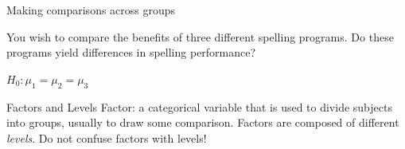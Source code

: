 \documentclass[presentation]{beamer}
\begin{document}
\begin{frame}[label={sec:org378e3be}]{Making comparisons across groups}
\begin{example}[Spelling]
You wish to compare the benefits of three different spelling programs.  Do
these programs yield differences in spelling performance?
\end{example}

\(H_0: \mu_1 = \mu_2 = \mu_3\)

\begin{alertblock}{Factors and Levels}
Factor: a categorical variable that is used to divide subjects into
groups, usually to draw some comparison.  Factors are composed of
different \emph{levels}.  \alert{Do not confuse factors with levels!}
\end{alertblock}
\end{frame}
\end{document}
